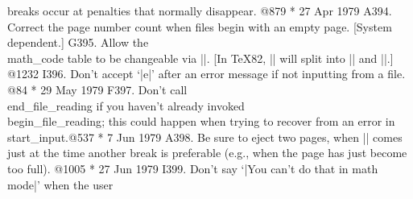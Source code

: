 	breaks occur at penalties that normally disappear. @879
* 27 Apr 1979
A394. Correct the page number count when files begin with an empty page.
	[System dependent.]
G395. Allow the \\{math_code} table to be changeable via |\chcode|.
	[In \TeX82, |\chcode| will split into |\mathcode| and |\catcode|.] @1232
I396. Don't accept `|e|' after an error message if not
	inputting from a file. @84
* 29 May 1979
F397. Don't call \\{end_file_reading} if you haven't already invoked
	\\{begin_file_reading}; this could happen when trying to
	recover from an error in \\{start_input}.@537
* 7 Jun 1979
A398. Be sure to eject two pages,
	when |\eject| comes just at the time another break is preferable
	(e.g., when the page has just become too full). @1005
* 27 Jun 1979
I399. Don't say `|You can't do that in math mode|' when the user
